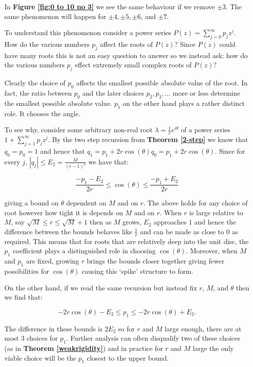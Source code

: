\documentclass[11pt]{amsart}
\numberwithin{theorem}{section} %
\numberwithin{corollary}{section}
\numberwithin{lemma}{section}
\numberwithin{proposition}{section}
\numberwithin{definition}{section}
\begin{document}
In \textbf{Figure \ref{fig:0 to 10 no 3}} we see the same behaviour if we remove $\pm 3$. The same phenomenon will happen for $\pm 4, \pm 5, \pm 6$, and $\pm 7$.


To understand this phenomenon consider a power series $P(z) = \sum_{j=0}^{\infty} p_j z^j$. How do the various numbers $p_j$ affect the roots of $P(z)$? Since $P(z)$ could have many roots this is not an easy question to answer so we instead ask: how do the various numbers $p_j$ effect extremely small complex roots of $P(z)$? 

Clearly the choice of $p_0$ affects the smallest possible absolute value of the root. In fact, the ratio between $p_0$ and the later choices $p_2, p_3, ...$ more or less determine the smallest possible absolute value. $p_1$ on the other hand plays a rather distinct role. It chooses the angle.

To see why, consider some arbitrary non-real root $\lambda = \frac{1}{r}e^{i\theta}$ of a power series $1 + \sum_{j=1}^\infty p_jz^j$. By the two step recursion from \textbf{Theorem \ref{2-step}} we know that $q_0 = p_0 = 1$ and hence that $q_1 = p_1 + 2r\cos(\theta)q_0 = p_1 + 2r\cos(\theta)$. Since for every $j$, $|q_j| \leqslant E_2 = \frac{M}{(r-1)^2}$ we have that:

\[
\frac{-p_1 - E_2}{2r} \leqslant \cos(\theta) \leqslant \frac{-p_1+E_2}{2r}
\]

giving a bound on $\theta$ dependent on $M$ and on $r$. The above holds for any choice of root however how tight it is depends on $M$ and on $r$. When $r$ is large relative to $M$, say $\sqrt{M} \leqslant r \leqslant \sqrt{M}+1$ then as $M$ grows, $E_2$ approaches $1$ and hence the difference between the bounds behaves like $\frac{1}{r}$ and can be made as close to $0$ as required. This means that for roots that are relatively deep into the unit disc, the $p_1$ coefficient plays a distinguished role in choosing $\cos(\theta)$. Moreover, when $M$ and $p_1$ are fixed, growing $r$ brings the bounds closer together giving fewer possibilities for $\cos(\theta)$ causing this `spike' structure to form.

On the other hand, if we read the same recursion but instead fix $r$, $M$, and $\theta$ then we find that:

\[
-2r\cos(\theta) - E_2 \leqslant p_1 \leqslant -2r\cos(\theta) + E_2.
\]

The difference in these bounds is $2E_2$ so for $r$ and $M$ large enough, there are at most $3$ choices for $p_1$. Further analysis can often disqualify two of these choices (as in \textbf{Theorem \ref{weakrigidity}}) and in practice for $r$ and $M$ large the only viable choice will be the $p_1$ closest to the upper bound.
\end{document}
